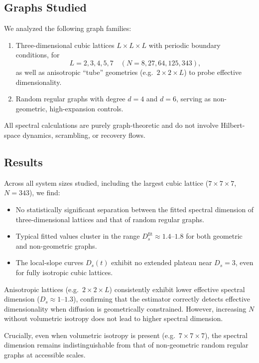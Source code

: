 \subsection{Graphs Studied}

We analyzed the following graph families:
\begin{enumerate}
\item Three-dimensional cubic lattices $L \times L \times L$ with periodic boundary conditions, for
\[
L = 2, 3, 4, 5, 7 \quad (N = 8, 27, 64, 125, 343),
\]
as well as anisotropic ``tube'' geometries (e.g.\ $2 \times 2 \times L$) to probe effective dimensionality.
\item Random regular graphs with degree $d=4$ and $d=6$, serving as non-geometric, high-expansion controls.
\end{enumerate}

All spectral calculations are purely graph-theoretic and do not involve Hilbert-space dynamics, scrambling, or recovery flows.

\subsection{Results}

Across all system sizes studied, including the largest cubic lattice ($7 \times 7 \times 7$, $N=343$), we find:
\begin{itemize}
\item No statistically significant separation between the fitted spectral dimension of three-dimensional lattices and that of random regular graphs.
\item Typical fitted values cluster in the range $D_s^{\mathrm{fit}} \approx 1.4$--$1.8$ for both geometric and non-geometric graphs.
\item The local-slope curves $D_s(t)$ exhibit no extended plateau near $D_s = 3$, even for fully isotropic cubic lattices.
\end{itemize}

Anisotropic lattices (e.g.\ $2 \times 2 \times L$) consistently exhibit lower effective spectral dimension ($D_s \approx 1$--$1.3$), confirming that the estimator correctly detects effective dimensionality when diffusion is geometrically constrained. However, increasing $N$ without volumetric isotropy does not lead to higher spectral dimension.

Crucially, even when volumetric isotropy is present (e.g.\ $7 \times 7 \times 7$), the spectral dimension remains indistinguishable from that of non-geometric random regular graphs at accessible scales.

